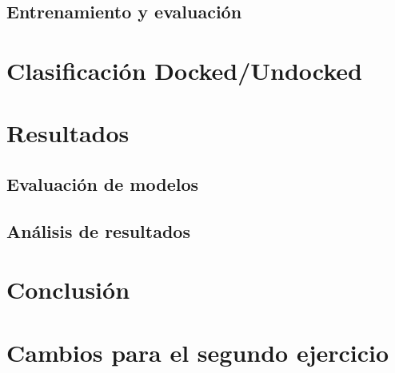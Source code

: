 \documentclass{article}
\begin{document}
\subsection*{Entrenamiento y evaluación}

\section*{Clasificación Docked/Undocked}

\section*{Resultados}

\subsection*{Evaluación de modelos}

\subsection*{Análisis de resultados}

\section*{Conclusión}


\section*{Cambios para el segundo ejercicio}
\end{document}
